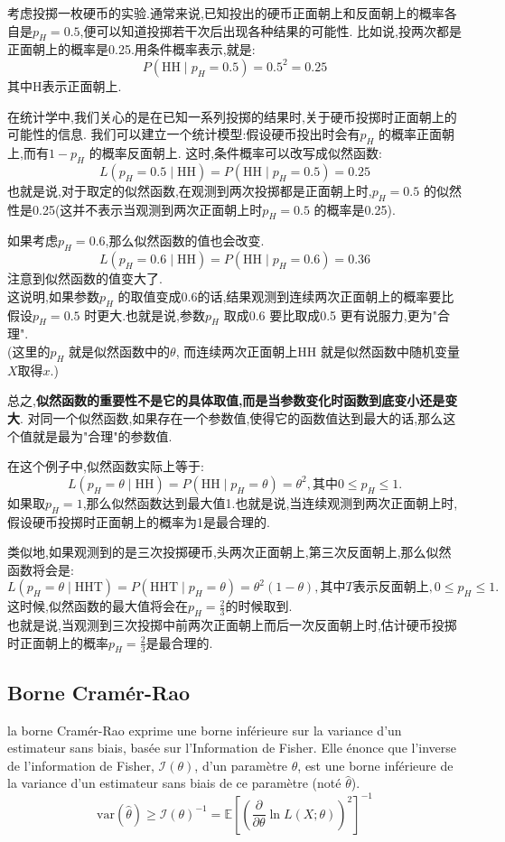 \documentclass{article}
\begin{document}
\begin{example}
考虑投掷一枚硬币的实验.通常来说,已知投出的硬币正面朝上和反面朝上的概率各自是$p_H = 0.5$,便可以知道投掷若干次后出现各种结果的可能性.
比如说,投两次都是正面朝上的概率是0.25.用条件概率表示,就是:
$$ P(\mbox{HH} \mid p_H = 0.5) = 0.5^2 = 0.25 $$
其中H表示正面朝上.

在统计学中,我们关心的是在已知一系列投掷的结果时,关于硬币投掷时正面朝上的可能性的信息.
我们可以建立一个统计模型:假设硬币投出时会有$p_H$  的概率正面朝上,而有$1 - p_H$ 的概率反面朝上.
这时,条件概率可以改写成似然函数:
$$ L(p_H =  0.5 \mid \mbox{HH}) = P(\mbox{HH}\mid p_H = 0.5) =0.25 $$
也就是说,对于取定的似然函数,在观测到两次投掷都是正面朝上时,$p_H = 0.5$ 的似然性是0.25(这并不表示当观测到两次正面朝上时$p_H= 0.5$ 的概率是0.25).

如果考虑$p_H = 0.6$,那么似然函数的值也会改变.
$$ L(p_H = 0.6 \mid \mbox{HH}) = P(\mbox{HH}\mid p_H = 0.6) =0.36 $$
注意到似然函数的值变大了.\\
这说明,如果参数$p_H$ 的取值变成0.6的话,结果观测到连续两次正面朝上的概率要比假设$p_H = 0.5$ 时更大.也就是说,参数$p_H$ 取成0.6 要比取成0.5 更有说服力,更为"合理".
\\(这里的$p_H$ 就是似然函数中的$\theta$, 而连续两次正面朝上HH 就是似然函数中随机变量$X$取得$x$.)

总之,\textbf{似然函数的重要性不是它的具体取值,而是当参数变化时函数到底变小还是变大}.
对同一个似然函数,如果存在一个参数值,使得它的函数值达到最大的话,那么这个值就是最为"合理"的参数值.

在这个例子中,似然函数实际上等于:
$$ L(p_H = \theta  \mid \mbox{HH}) = P(\mbox{HH}\mid p_H = \theta) =\theta^2 , 其中0 \le p_H  \le 1.  $$
如果取$p_H = 1$,那么似然函数达到最大值1.也就是说,当连续观测到两次正面朝上时,假设硬币投掷时正面朝上的概率为1是最合理的.

类似地,如果观测到的是三次投掷硬币,头两次正面朝上,第三次反面朝上,那么似然函数将会是:
$$ L(p_H = \theta  \mid \mbox{HHT}) = P(\mbox{HHT}\mid p_H = \theta) =\theta^2(1 - \theta) , 其中T表示反面朝上,0 \le p_H  \le 1.  $$
这时候,似然函数的最大值将会在$p_H = \frac{2}{3}$的时候取到.\\
也就是说,当观测到三次投掷中前两次正面朝上而后一次反面朝上时,估计硬币投掷时正面朝上的概率$p_H = \frac{2}{3}$是最合理的.
\end{example}

\subsection{Borne Cram\'er-Rao}
la borne Cram\'er-Rao exprime une borne inf\'erieure sur la variance d'un estimateur sans biais, bas\'ee sur l'Information de Fisher.
Elle \'enonce que l'inverse de l'information de Fisher, $\mathcal{I}(\theta)$, d'un param\`etre $\theta$,
est une borne inf\'erieure de la variance d'un estimateur sans biais de ce param\`etre (not\'e $\widehat{\theta}$).
$$
\mathrm{var} \left(\widehat{\theta}\right)
\geq
\mathcal{I}(\theta)^{-1}
= \mathbb{E}
 \left[
   \left(\frac{\partial}{\partial \theta} \ln L(X;\theta)\right)^2
 \right]^{-1}
$$
\end{document}
